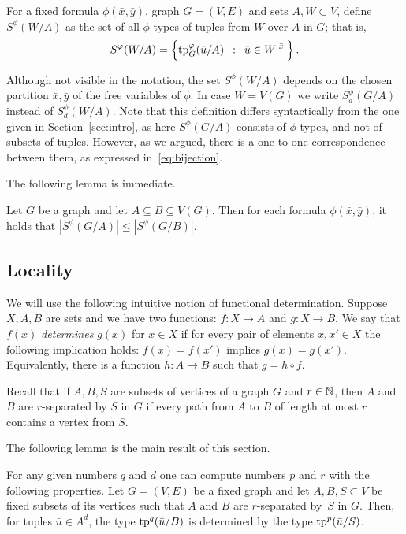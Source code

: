 For a fixed formula $\phi(\bar x,\bar y)$,  graph $G=(V,E)$ and sets $A,W\subset V$, define
 $S^\phi(W/A)$ as the set of all $\phi$-types of tuples from $W$ over $A$ in $G$; that is, 
\begin{equation*}
S^\varphi(W/A)=\left\{\mathrm{tp}^\varphi_G(\bar u/A) \,~:~\, \bar u\in W^{|\bar x|} \right\}.
\end{equation*}

Although not visible in the notation, the set $S^\phi(W/A)$ depends on the chosen partition $\bar x,\bar y$ of the free variables of $\phi$.
In case $W=V(G)$ we write $S^{\phi}_d(G/A)$ instead of $S^{\phi}_d(W/A)$.
Note that this definition differs syntactically from the one given in Section~\ref{sec:intro}, as here $S^{\phi}(G/A)$ consists of $\phi$-types, and not of subsets of tuples.
However, as we argued, there is a one-to-one correspondence between them, as expressed in~\eqref{eq:bijection}.

The following lemma is immediate.
\begin{lemma}\label{lem:types-over-B}
Let $G$ be a graph and let $A\subseteq B\subseteq V(G)$. Then for each formula $\phi(\bar x,\bar y)$, it holds that
$|S^\phi(G/A)|\leq |S^\phi(G/B)|$. 
\end{lemma}

\subsection{Locality}
We will use the following intuitive notion of functional determination.
Suppose $X,A,B$ are sets and we have two functions: $f\colon X\to A$ and $g\colon X\to B$.
We say that $f(x)$ {\em{determines}} $g(x)$ for $x\in X$ if for every pair of elements $x,x'\in X$ the following implication holds: $f(x)=f(x')$ implies $g(x)=g(x')$.
Equivalently, there is a function $h\colon A\to B$ such that $g=h\circ f$.

Recall that if $A,B,S$ are subsets of vertices of a graph $G$ and $r\in\mathbb{N}$,
then $A$ and $B$ are $r$-separated by $S$ in $G$
if every path from $A$ to $B$ of length at most $r$ contains a vertex from $S$.

\medskip
The following lemma is the main result of this section. 

\begin{lemma}\label{lem:types}
For any given numbers $q$ and $d$
one can compute numbers $p$ and $r$ with the following properties.
Let $G=(V,E)$ be a fixed graph and let $A,B,S\subset V$ be fixed subsets of its vertices
such that $A$ and $B$ are $r$-separated by~$S$ in $G$.
Then, for tuples $\bar u\in A^{d}$, the type $\mathrm{tp}^q(\bar u/B)$ is determined by the type $\mathrm{tp}^{p}(\bar u/S)$.
\end{lemma}

